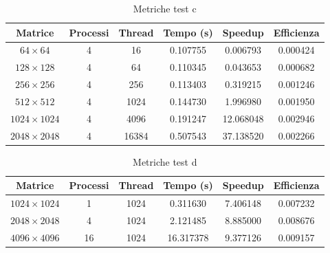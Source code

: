 \begin{table}[H]
    \centering
    \begin{tabular}{cccccc}
        \hline
        \textbf{Matrice}   & \textbf{Processi} & \textbf{Thread} & \textbf{Tempo (s)} & \textbf{Speedup} & \textbf{Efficienza} \\
        \hline
        $64 \times 64$     & 4                 & 16              & 0.107755           & 0.006793         & 0.000424            \\
        $128 \times 128$   & 4                 & 64              & 0.110345           & 0.043653         & 0.000682            \\
        $256 \times 256$   & 4                 & 256             & 0.113403           & 0.319215         & 0.001246            \\
        $512 \times 512$   & 4                 & 1024            & 0.144730           & 1.996980         & 0.001950            \\
        $1024 \times 1024$ & 4                 & 4096            & 0.191247           & 12.068048        & 0.002946            \\
        $2048 \times 2048$ & 4                 & 16384           & 0.507543           & 37.138520        & 0.002266            \\
        \hline
    \end{tabular}
    \caption{Metriche test c}
\end{table}

\begin{table}[H]
    \centering
    \begin{tabular}{cccccc}
        \hline
        \textbf{Matrice}   & \textbf{Processi} & \textbf{Thread} & \textbf{Tempo (s)} & \textbf{Speedup} & \textbf{Efficienza} \\
        \hline
        $1024 \times 1024$ & 1                 & 1024            & 0.311630           & 7.406148         & 0.007232            \\
        $2048 \times 2048$ & 4                 & 1024            & 2.121485           & 8.885000         & 0.008676            \\
        $4096 \times 4096$ & 16                & 1024            & 16.317378          & 9.377126         & 0.009157            \\
        \hline
    \end{tabular}
    \caption{Metriche test d}
\end{table}

